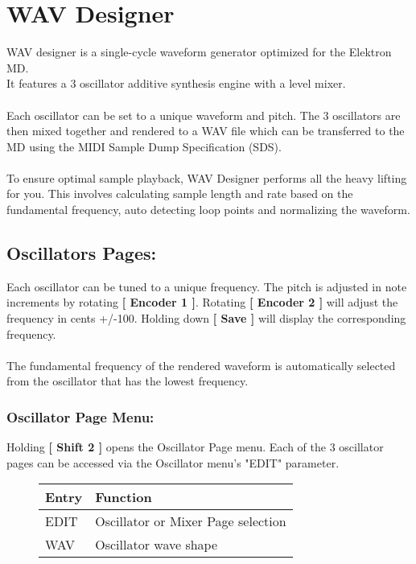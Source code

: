 \chapter{WAV Designer}
WAV designer is a single-cycle waveform generator optimized for the Elektron MD.\\
It features a 3 oscillator additive synthesis engine with a level mixer.\\
\\
Each oscillator can be set to a unique waveform and pitch. The 3 oscillators are then mixed together and rendered to a WAV file which can be transferred to the MD using the MIDI Sample Dump Specification (SDS).\\
\\
To ensure optimal sample playback, WAV Designer performs all the heavy lifting for you. This involves calculating sample length and rate based on the fundamental frequency, auto detecting loop points and normalizing the waveform.
\section{Oscillators Pages:}
Each oscillator can be tuned to a unique frequency. The pitch is adjusted in note increments by rotating \textbf{[ Encoder 1 ]}. Rotating \textbf{[ Encoder 2 ]} will adjust the frequency in cents +/-100. Holding down \textbf{[ Save ]} will display the corresponding frequency.\\
\\The fundamental frequency of the rendered waveform is automatically selected from the oscillator that has the lowest frequency.\\

\newpage
\subsection{Oscillator Page Menu:}
Holding \textbf{[ Shift 2 ]} opens the Oscillator Page menu.
Each of the 3 oscillator pages can be accessed via the Oscillator menu's "EDIT" parameter.
\begin{figure}[hb]
    \begin{tabular}{|l|l|}
    \hline
    \rowcolor[HTML]{C0C0C0}
    Entry     & Function \\ \hline
    EDIT      & Oscillator or Mixer Page selection \\ \hline
    WAV       & Oscillator wave shape\\ \hline
    \end{tabular}
\end{figure}
\newpage


